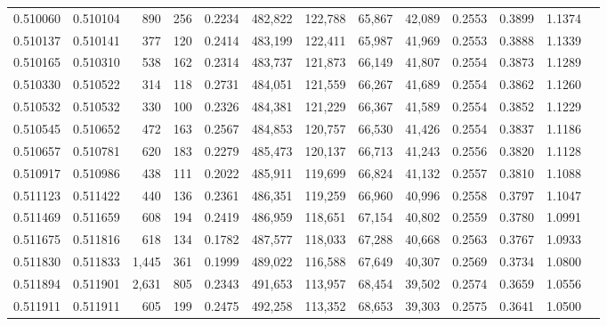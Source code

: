 \begin{tabular}{rrrrrrrrrrrrr}
0.510060 & 0.510104 &   890 &   256 &                                     0.2234 & 482,822 & 122,788 &  65,867 &  42,089 & 0.2553 & 0.3899 & 1.1374 \\
0.510137 & 0.510141 &   377 &   120 &                                     0.2414 & 483,199 & 122,411 &  65,987 &  41,969 & 0.2553 & 0.3888 & 1.1339 \\
0.510165 & 0.510310 &   538 &   162 &                                     0.2314 & 483,737 & 121,873 &  66,149 &  41,807 & 0.2554 & 0.3873 & 1.1289 \\
0.510330 & 0.510522 &   314 &   118 &                                     0.2731 & 484,051 & 121,559 &  66,267 &  41,689 & 0.2554 & 0.3862 & 1.1260 \\
0.510532 & 0.510532 &   330 &   100 &                                     0.2326 & 484,381 & 121,229 &  66,367 &  41,589 & 0.2554 & 0.3852 & 1.1229 \\
0.510545 & 0.510652 &   472 &   163 &                                     0.2567 & 484,853 & 120,757 &  66,530 &  41,426 & 0.2554 & 0.3837 & 1.1186 \\
0.510657 & 0.510781 &   620 &   183 &                                     0.2279 & 485,473 & 120,137 &  66,713 &  41,243 & 0.2556 & 0.3820 & 1.1128 \\
0.510917 & 0.510986 &   438 &   111 &                                     0.2022 & 485,911 & 119,699 &  66,824 &  41,132 & 0.2557 & 0.3810 & 1.1088 \\
0.511123 & 0.511422 &   440 &   136 &                                     0.2361 & 486,351 & 119,259 &  66,960 &  40,996 & 0.2558 & 0.3797 & 1.1047 \\
0.511469 & 0.511659 &   608 &   194 &                                     0.2419 & 486,959 & 118,651 &  67,154 &  40,802 & 0.2559 & 0.3780 & 1.0991 \\
0.511675 & 0.511816 &   618 &   134 &                                     0.1782 & 487,577 & 118,033 &  67,288 &  40,668 & 0.2563 & 0.3767 & 1.0933 \\
0.511830 & 0.511833 & 1,445 &   361 &                                     0.1999 & 489,022 & 116,588 &  67,649 &  40,307 & 0.2569 & 0.3734 & 1.0800 \\
0.511894 & 0.511901 & 2,631 &   805 &                                     0.2343 & 491,653 & 113,957 &  68,454 &  39,502 & 0.2574 & 0.3659 & 1.0556 \\
0.511911 & 0.511911 &   605 &   199 &                                     0.2475 & 492,258 & 113,352 &  68,653 &  39,303 & 0.2575 & 0.3641 & 1.0500 \\

\end{tabular}
